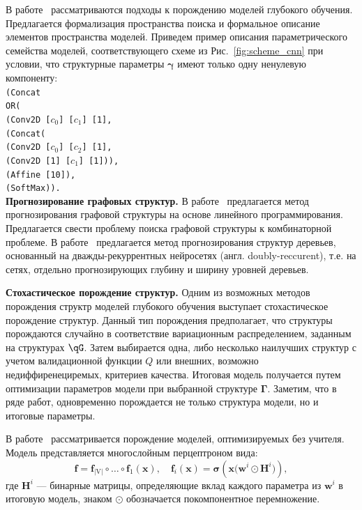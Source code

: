 В работе~\cite{search_space} рассматриваются подходы к порождению моделей глубокого обучения. Предлагается формализация пространства поиска и формальное описание элементов  пространства моделей. Приведем пример описания параметрического семейства моделей, соответствующего схеме из Рис.~\ref{fig:scheme_cnn} при условии, что структурные параметры $\boldsymbol{\gamma}$ имеют только одну ненулевую компоненту:\\
\texttt{(Concat\\
\text{\quad}OR(\\
\text{\quad\quad}(Conv2D [$c_0$] [$c_1$] [1],\\
\text{\quad\quad}(Concat(\\
\text{\quad\quad\quad}(Conv2D [$c_0$] [$c_2$] [1],\\
\text{\quad\quad\quad}(Conv2D [1] [$c_1$] [1])),\\
\text{\quad}(Affine [10]),\\
\text{\quad}(SoftMax)).} \\



\textbf{Прогнозирование графовых структур. }
В работе~\cite{jaakkola2010learning} предлагается метод прогнозирования графовой структуры на основе линейного программирования. Предлагается свести проблему поиска графовой структуры к комбинаторной проблеме.
В работе~\cite{double_rnn} предлагается метод прогнозирования структур деревьев, основанный на дважды-рекуррентных нейросетях (англ. doubly-reccurent), т.е. на сетях, отдельно прогнозирующих глубину и ширину уровней деревьев.

\par{\textbf{Стохастическое порождение структур. }}
Одним из возможных методов порождения структр моделей глубокого обучения выступает стохастическое порождение структур.
Данный тип порождения предполагает, что структуры порождаются случайно в соответствие  вариационным распределением, заданным на структурах $\qG$. Затем выбирается одна, либо несколько наилучших структур с учетом валидационной функции $Q$ или внешних, возможно недиффиренециремых, критериев качества. Итоговая модель получается путем оптимизации параметров модели при выбранной структуре $\boldsymbol{\Gamma}$. 
Заметим, что в ряде работ, одновременно порождается не только структура модели, но и итоговые параметры.

В работе~\cite{cib} рассматривается порождение моделей, оптимизируемых без учителя. Модель представляется многослойным перцептроном вида:
\[
    \mathbf{f} = \mathbf{f}_\text{|V|} \circ \dots \circ \mathbf{f}_1 (\mathbf{x}), \quad \mathbf{f}_i(\mathbf{x}) = \boldsymbol{\sigma}(\mathbf{x} \bigl(\mathbf{w}^i \odot \mathbf{H}^i\bigr)),
\]
где $\mathbf{H}^i$ --- бинарные матрицы, определяющие вклад каждого параметра из $\mathbf{w}^i$ в итоговую модель, знаком $\odot$  обозначается покомпонентное перемножение. 

